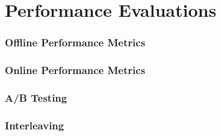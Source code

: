 %
%
%
\chapter{Performance Evaluations}
\label{intro} %

\subsection{Offline Performance Metrics}
\subsection{Online Performance Metrics}
\subsection{A/B Testing}
\subsection{Interleaving}


